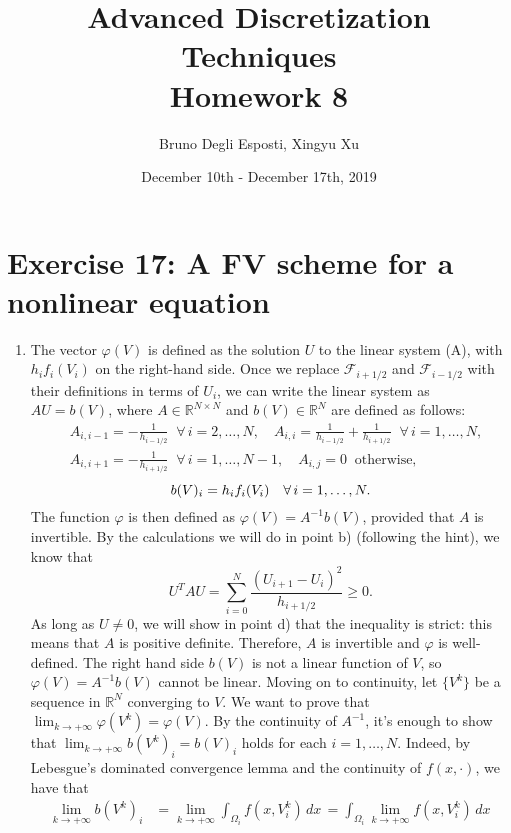 \documentclass[a4paper]{article}
\title{\huge{Advanced Discretization Techniques \\ Homework 8}}
\author{\Large{Bruno Degli Esposti, Xingyu Xu}}
\date{December 10th - December 17th, 2019}
\newcommand{\dx}{\, dx \,}
\newcommand{\R}{\mathbb{R}}
\begin{document}
\maketitle

\section*{Exercise 17: A FV scheme for a nonlinear equation}
\begin{enumerate}[label=\textbf{\alph*)},leftmargin=*]
\item The vector $\varphi(V)$ is defined as the solution $U$ to
	the linear system (A), with $h_i f_i(V_i)$ on the right-hand side.
	Once we replace $\mathcal{F}_{i+1/2}$ and $\mathcal{F}_{i-1/2}$ with their
	definitions in terms of $U_i$, we can write the linear system as
	$AU = b(V)$, where $A \in \R^{N \times N}$ and $b(V) \in \R^N$
	are defined as follows:
	\begin{align*}
&	A_{i,i-1} = -\frac{1}{h_{i-1/2}} \;\; \forall \, i = 2,\dots,N, \quad
	A_{i,i} = \frac{1}{h_{i-1/2}} + \frac{1}{h_{i+1/2}} \;\; \forall \, i = 1,\dots,N, \\
&	A_{i,i+1} = -\frac{1}{h_{i+1/2}} \;\; \forall \, i = 1,\dots,N-1, \quad
	A_{i,j} = 0 \;\; \text{otherwise,}
	\end{align*}
	\[
	b(V)_i = h_i f_i(V_i) \quad \forall \, i = 1,\dots,N. \\[4pt]
	\]
	The function $\varphi$ is then defined as $\varphi(V) = A^{-1}b(V)$,
	provided that $A$ is invertible. By the calculations we will do in point b)
	(following the hint), we know that
	\[
	U^T A U = \sum_{i=0}^N \frac{(U_{i+1}-U_i)^2}{h_{i+1/2}} \geq 0.
	\]
	As long as $U \neq 0$, we will show in point d) that the inequality is strict:
	this means that $A$ is positive definite. Therefore, $A$ is invertible
	and $\varphi$ is well-defined.
	The right hand side $b(V)$ is not a linear function of $V$,
	so $\varphi(V) = A^{-1}b(V)$ cannot be linear.
	Moving on to continuity, let $\{V^k\}$ be a sequence in $\R^N$
	converging to $V$. We want to prove that
	$\lim_{k \to +\infty} \varphi(V^k) = \varphi(V)$.
	By the continuity of $A^{-1}$, it's enough to show that
	$\lim_{k \to +\infty} b(V^k)_i = b(V)_i$ holds for each $i = 1,\dots,N$.
	Indeed, by Lebesgue's dominated convergence lemma and the continuity of
	$f(x,\cdot)$, we have that
	\begin{align*}
	\lim_{k \to +\infty} b(V^k)_i
&	= \lim_{k \to +\infty} \int_{\Omega_i} f(x,V_i^k) \dx
	= \int_{\Omega_i} \lim_{k \to +\infty} f(x,V_i^k) \dx \\

\end{align*}
\end{enumerate}
\end{document}
